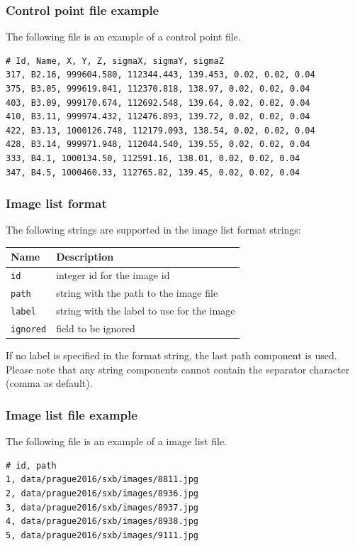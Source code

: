 \documentclass{article}
\begin{document}
\subsubsection{Control point file example}
\label{sec:ctrlExample}
The following file is an example of a control point file.
\begin{verbatim}
# Id, Name, X, Y, Z, sigmaX, sigmaY, sigmaZ
317, B2.16, 999604.580, 112344.443, 139.453, 0.02, 0.02, 0.04
375, B3.05, 999619.041, 112370.818, 138.97, 0.02, 0.02, 0.04
403, B3.09, 999170.674, 112692.548, 139.64, 0.02, 0.02, 0.04
410, B3.11, 999974.432, 112476.893, 139.72, 0.02, 0.02, 0.04
422, B3.13, 1000126.748, 112179.093, 138.54, 0.02, 0.02, 0.04
428, B3.14, 999971.948, 112044.540, 139.55, 0.02, 0.02, 0.04
333, B4.1, 1000134.50, 112591.16, 138.01, 0.02, 0.02, 0.04
347, B4.5, 1000460.33, 112765.82, 139.45, 0.02, 0.02, 0.04
\end{verbatim}
\subsubsection{Image list format}
\label{sec:imageFormat}
The following strings are supported in the image list format strings:
\begin{center}
\begin{tabular}{l|l}
Name & Description\\
\hline
\texttt{id} & integer id for the image id\\
\texttt{path} & string with the path to the image file\\
\texttt{label} & string with the label to use for the image\\
\texttt{ignored} & field to be ignored\\
\end{tabular}
\end{center}
If no label is specified in the format string, the last path component
is used. Please note that any string components cannot contain the
separator character (comma as default).
\subsubsection{Image list file example}
\label{sec:imageExample}
The following file is an example of a image list file.
\begin{verbatim}
# id, path
1, data/prague2016/sxb/images/8811.jpg
2, data/prague2016/sxb/images/8936.jpg
3, data/prague2016/sxb/images/8937.jpg
4, data/prague2016/sxb/images/8938.jpg
5, data/prague2016/sxb/images/9111.jpg
\end{verbatim}
\end{document}
